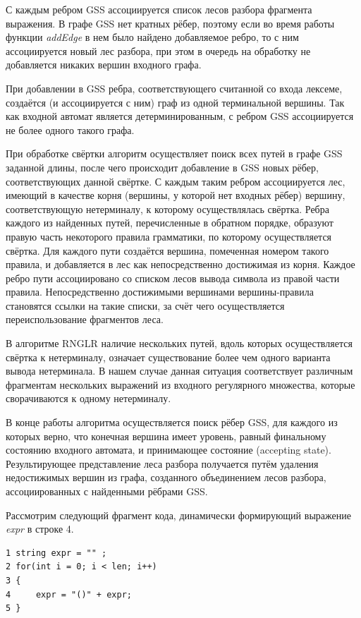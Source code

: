 С каждым ребром GSS ассоциируется список лесов разбора фрагмента выражения. В графе GSS нет кратных рёбер, поэтому если во время работы функции \emph{addEdge} в нем было найдено добавляемое ребро, то с ним ассоциируется новый лес разбора, при этом в очередь на обработку не добавляется никаких вершин входного графа.  

При добавлении в GSS ребра, соответствующего считанной со входа лексеме, создаётся (и ассоциируется с ним) граф из одной терминальной вершины. Так как входной автомат является детерминированным, с ребром GSS ассоциируется не более одного такого графа.

При обработке свёртки алгоритм осуществляет поиск всех путей в графе GSS заданной длины, после чего происходит добавление в GSS новых рёбер, соответствующих данной свёртке. С каждым таким ребром ассоциируется лес, имеющий в качестве корня (вершины, у которой нет входных рёбер) вершину, соответствующую нетерминалу, к которому осуществлялась свёртка. Ребра каждого из найденных путей, перечисленные в обратном порядке, образуют правую часть некоторого правила грамматики, по которому осуществляется свёртка. Для каждого пути создаётся вершина, помеченная номером такого правила, и добавляется в лес как непосредственно достижимая из корня. Каждое ребро пути ассоциировано со списком лесов вывода символа из правой части правила. Непосредственно достижимыми вершинами вершины-правила становятся ссылки на такие списки, за счёт чего осуществляется переиспользование фрагментов леса.

В алгоритме RNGLR наличие нескольких путей, вдоль которых осуществляется свёртка к нетерминалу, означает существование более чем одного варианта вывода нетерминала. В нашем случае данная ситуация соответствует различным фрагментам нескольких выражений из входного регулярного множества, которые сворачиваются к одному нетерминалу. 

В конце работы алгоритма осуществляется поиск рёбер GSS, для каждого из которых верно, что конечная вершина имеет уровень, равный финальному состоянию входного автомата, и принимающее состояние (accepting state). Результирующее представление леса разбора получается путём удаления недостижимых вершин из графа, созданного объединением лесов разбора, ассоциированных с найденными рёбрами GSS.

Рассмотрим следующий фрагмент кода, динамически формирующий выражение \emph{expr} в строке 4. 
\begin{verbatim}
1 string expr = "" ;
2 for(int i = 0; i < len; i++) 
3 {
4     expr = "()" + expr;
5 }
\end{verbatim}

